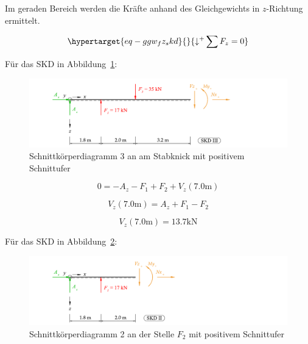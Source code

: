 \documentclass[
  12pt,
  letterpaper,
  DIV=11,
  egregdoesnotlikesansseriftitles]{scrartcl}
\begin{document}
Im geraden Bereich werden die Kräfte anhand des Gleichgewichts in
\(z\)-Richtung ermittelt.

\begin{equation}\protect\hypertarget{eq-ggw_fz_skd}{}{
{\downarrow^+}\sum F_z = 0
}\label{eq-ggw_fz_skd}\end{equation}

Für das SKD in Abbildung~\ref{fig-skd_3}:

\begin{figure}[H]

{\centering \includegraphics{BSI_HS23_Testat_02_files/mediabag/../images/Testat_02_HS23_SKD_3.pdf}

}

\caption{\label{fig-skd_3}Schnittkörperdiagramm 3 an am Stabknick mit
positivem Schnittufer}

\end{figure}

\begin{equation}0 = - A_{z} - F_{1} + F_{2} + V_{z}{\left(7.0 \text{m} \right)}\end{equation}

\begin{equation}V_{z}{\left(7.0 \text{m} \right)} = A_{z} + F_{1} - F_{2}\end{equation}

\begin{equation}V_{z}{\left(7.0 \text{m} \right)} = 13.7 \text{k} \text{N}\end{equation}

Für das SKD in Abbildung~\ref{fig-skd_2}:

\begin{figure}[H]

{\centering \includegraphics{BSI_HS23_Testat_02_files/mediabag/../images/Testat_02_HS23_SKD_2.pdf}

}

\caption{\label{fig-skd_2}Schnittkörperdiagramm 2 an der Stelle \(F_2\)
mit positivem Schnittufer}

\end{figure}
\end{document}
